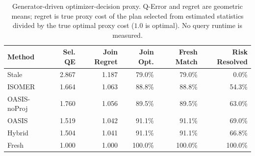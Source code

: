 \begin{table}[t]
  \centering
  \small
  \caption{Generator-driven optimizer-decision proxy. Q-Error and regret are geometric means; regret is true proxy cost of the plan selected from estimated statistics divided by the true optimal proxy cost ($1.0$ is optimal). No query runtime is measured.}
  \label{tab:optimizer_decision_proxy}
  \setlength{\tabcolsep}{4pt}
  \begin{tabular}{lrrrrr}
    \toprule
    Method & Sel. QE & Join Regret & Join Opt. & Fresh Match & Risk Resolved \\
    \midrule
    Stale & 2.867 & 1.187 & 79.0\% & 79.0\% & 0.0\% \\
    ISOMER & 1.664 & 1.063 & 88.8\% & 88.8\% & 54.3\% \\
    OASIS-noProj & 1.760 & 1.056 & 89.5\% & 89.5\% & 63.0\% \\
    OASIS & 1.519 & 1.042 & 91.1\% & 91.1\% & 69.0\% \\
    Hybrid & 1.504 & 1.041 & 91.1\% & 91.1\% & 66.8\% \\
    Fresh & 1.000 & 1.000 & 100.0\% & 100.0\% & 100.0\% \\
    \bottomrule
  \end{tabular}
\end{table}

